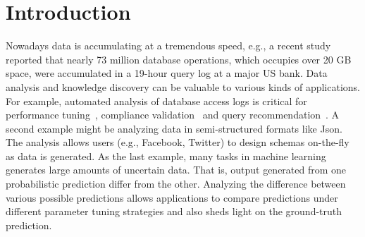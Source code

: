 \chapter{Introduction}\label{chap:intro}
Nowadays data is accumulating at a tremendous speed, e.g., a recent study~\cite{DBLP:conf/www/KulLXCCKU16} reported that nearly 73 million database operations, which occupies over 20 GB space, were accumulated in a 19-hour query log at a major US bank. 
Data analysis and knowledge discovery can be valuable to various kinds of applications.
For example, automated analysis of database access logs is critical for performance tuning~\cite{DBLP:conf/sigmod/BrunoC05}, compliance validation~\cite{DBLP:conf/icalp/Dwork06} and query recommendation~\cite{DBLP:journals/debu/ChatzopoulouEKMPV11}.
A second example might be analyzing data in semi-structured formats like Json. 
The analysis allows users (e.g., Facebook, Twitter) to design schemas on-the-fly as data is generated.
As the last example, many tasks in machine learning generates large amounts of uncertain data.
That is, output generated from one probabilistic prediction differ from the other.
Analyzing the difference between various possible predictions allows applications to compare predictions under different parameter tuning strategies and also sheds light on the ground-truth prediction.

